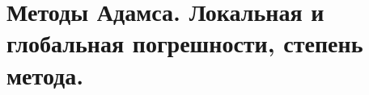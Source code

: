 \documentclass[../../calc-math-exam-2023.tex]{subfiles}
\begin{document}
    \section{Методы Адамса. Локальная и глобальная погрешности, степень метода.}\label{sec:ch25}
\end{document}
